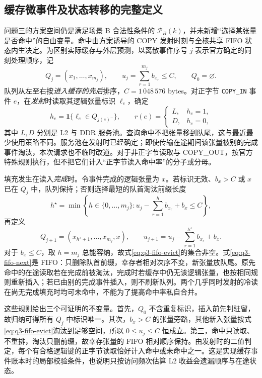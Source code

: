 \subsection{缓存微事件及状态转移的完整定义}
问题三的方案空间仍是满足场景 B 合法性条件的 $\mathcal P_B(k)$，并未新增“选择某张量是否命中”的自由变量。命中由方案诱导的 COPY 发射时刻与全核共享 FIFO 状态内生决定。为区别实际缓存与外层预测，以离散事件序号 $j$ 表示官方确定的同刻处理顺序，记
\begin{equation}\label{eq:q3-cache-state}
Q_j=(x_1,\ldots,x_{m_j}),\qquad
u_j=\sum_{r=1}^{m_j}b_{x_r}\le C,\qquad Q_0=\varnothing .
\end{equation}
队列从左至右按\emph{进入缓存的先后}排序，$C=1\,048\,576$ bytes。对正字节 \texttt{COPY\_IN} 事件 $e$，在\emph{发射}时读取其逻辑张量标识 $\ell_e$，确定
\begin{equation}\label{eq:q3-lookup}
h_e=\mathbf 1\{\ell_e\in Q_{j(e)^-}\},\qquad
r(e)=
\begin{cases}
L,&h_e=1,\\
D,&h_e=0,
\end{cases}
\end{equation}
其中 $L,D$ 分别是 L2 与 DDR 服务池。查询命中不把张量移到队尾，这与最近最少使用策略不同。服务池在发射时已经确定；即使传输在途期间该张量被别的完成事件淘汰，本次请求也不临时改道。对于非正字节读取与 COPY\_OUT，按官方特殊规则执行，但不把它们计入“正字节读入命中率”的分子或分母。

填充发生在读入\emph{完成}时。令事件完成的逻辑张量为 $x$。若标识无效、$b_x>C$ 或 $x$ 已在 $Q_j$ 中，队列保持；否则选择最短的队首淘汰前缀长度
\begin{equation}\label{eq:q3-fifo-evict}
h^\star=\min\left\{h\in\{0,\ldots,m_j\}:
u_j-\sum_{r=1}^{h}b_{x_r}+b_x\le C\right\},
\end{equation}
再定义
\begin{equation}\label{eq:q3-fifo-next}
Q_{j+1}=(x_{h^\star+1},\ldots,x_{m_j},x),\qquad
u_{j+1}=u_j-\sum_{r=1}^{h^\star}b_{x_r}+b_x .
\end{equation}
对于 $b_x\le C$，取 $h=m_j$ 总能容纳，故式\eqref{eq:q3-fifo-evict}的集合非空。式\eqref{eq:q3-fifo-next}是 FIFO：只删除队首前缀，幸存者相对次序不变，新张量放队尾。原先命中的在途读取若在完成前被淘汰，完成时若缓存中仍无该逻辑张量，也按相同规则重新插入；若已由别的完成事件插入，则不刷新队列。两个几乎同时发射的冷读在尚无完成填充时均可未命中，不能为了提高命中率私自合并。

这些规则给出三个可证明的不变量。首先，$Q_0$ 不含重复标识，插入前先判驻留，故归纳可得所有 $Q_j$ 中标识唯一。其次，$b_x>C$ 的张量旁路，其他新入张量按式\eqref{eq:q3-fifo-evict}淘汰到足够空间，所以 $0\le u_j\le C$ 恒成立。第三，命中只读取、不重排，淘汰只删前缀，故幸存张量的 FIFO 相对顺序保持。由发射时的二值判定，每个有合格逻辑键的正字节读取恰好计入命中或未命中之一。这是实现缓存事件账本时的局部校验条件，也说明只按访问频次估算 L2 收益会遗漏顺序与在途状态。

